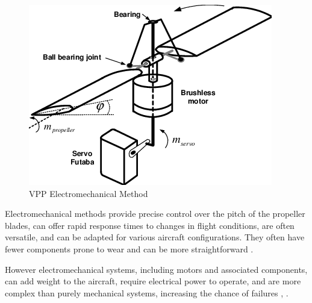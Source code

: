 \begin{figure}[H]
    \centering
    \includegraphics[scale=0.6]{ch2/assets/vpp_electric.png}
    \caption{VPP Electromechanical Method \cite{VPP6}}
    \label{fig:vpp_electric}
\end{figure}

Electromechanical methods provide precise control over the pitch of the propeller blades, can offer rapid response times to changes in flight conditions, are often versatile, and can be adapted for various aircraft configurations.
They often have fewer components prone to wear and can be more straightforward \cite{VPP8}.

However electromechanical systems, including motors and associated components, can add weight to the aircraft, require electrical power to operate, and are more complex than purely mechanical systems, increasing the chance of failures \cite{VPP2}, \cite{VPP8}.

